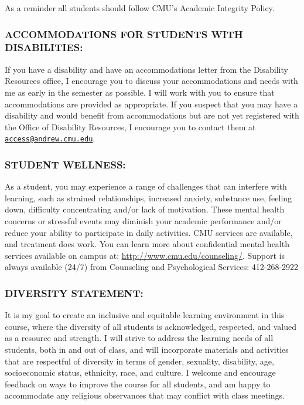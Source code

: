 \documentclass[
]{article}
\begin{document}
As a reminder all students should follow CMU's Academic Integrity
Policy.

\hypertarget{accommodations-for-students-with-disabilities}{%
\subsubsection{ACCOMMODATIONS FOR STUDENTS WITH
DISABILITIES:}\label{accommodations-for-students-with-disabilities}}

If you have a disability and have an accommodations letter from the
Disability Resources office, I encourage you to discuss your
accommodations and needs with me as early in the semester as possible. I
will work with you to ensure that accommodations are provided as
appropriate. If you suspect that you may have a disability and would
benefit from accommodations but are not yet registered with the Office
of Disability Resources, I encourage you to contact them at
\href{mailto:access@andrew.cmu.edu}{\nolinkurl{access@andrew.cmu.edu}}.

\hypertarget{student-wellness}{%
\subsubsection{STUDENT WELLNESS:}\label{student-wellness}}

As a student, you may experience a range of challenges that can
interfere with learning, such as strained relationships, increased
anxiety, substance use, feeling down, difficulty concentrating and/or
lack of motivation. These mental health concerns or stressful events may
diminish your academic performance and/or reduce your ability to
participate in daily activities. CMU services are available, and
treatment does work. You can learn more about confidential mental health
services available on campus at: \url{http://www.cmu.edu/counseling/}.
Support is always available (24/7) from Counseling and Psychological
Services: 412-268-2922

\hypertarget{diversity-statement}{%
\subsubsection{DIVERSITY STATEMENT:}\label{diversity-statement}}

It is my goal to create an inclusive and equitable learning environment
in this course, where the diversity of all students is acknowledged,
respected, and valued as a resource and strength. I will strive to
address the learning needs of all students, both in and out of class,
and will incorporate materials and activities that are respectful of
diversity in terms of gender, sexuality, disability, age, socioeconomic
status, ethnicity, race, and culture. I welcome and encourage feedback
on ways to improve the course for all students, and am happy to
accommodate any religious observances that may conflict with class
meetings.
\end{document}
